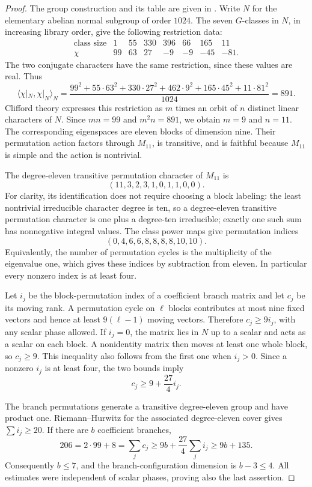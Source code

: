 \documentclass[11pt]{article}
\theoremstyle{definition}
\theoremstyle{remark}
\begin{document}
\begin{proof}
The group construction and its table are given in
\cite[\S1.2-9]{CTblLib}. Write $N$ for the elementary abelian normal
subgroup of order $1024$. The seven $G$-classes in $N$, in increasing
library order, give the following restriction data:
\[
\begin{array}{c|rrrrrrr}
\text{class size}&1&55&330&396&66&165&11\\
\chi&99&63&27&-9&-9&-45&-81.
\end{array}
\]
The two conjugate characters have the same restriction, since these
values are real. Thus
\[
 \langle\chi|_N,\chi|_N\rangle_N
 =\frac{99^2+55\cdot63^2+330\cdot27^2
       +462\cdot9^2+165\cdot45^2+11\cdot81^2}{1024}
 =891.
\]
Clifford theory expresses this restriction as $m$ times an orbit of
$n$ distinct linear characters of $N$. Since $mn=99$ and
$m^2n=891$, we obtain $m=9$ and $n=11$. The corresponding eigenspaces
are eleven blocks of dimension nine. Their permutation action
factors through $M_{11}$, is transitive, and is faithful because
$M_{11}$ is simple and the action is nontrivial.

The degree-eleven transitive permutation character of $M_{11}$ is
\[
 (11,3,2,3,1,0,1,1,0,0).
\]
For clarity, its identification does not require choosing a block
labeling: the least nontrivial irreducible character degree is ten,
so a degree-eleven transitive permutation character is one plus a
degree-ten irreducible; exactly one such sum has nonnegative integral
values. The class power maps give permutation indices
\[
 (0,4,6,6,8,8,8,8,10,10).
\]
Equivalently, the number of permutation cycles is the multiplicity
of the eigenvalue one, which gives these indices by subtraction
from eleven. In particular every nonzero index is at least four.

Let $i_j$ be the block-permutation index of a coefficient branch
matrix and let $c_j$ be its moving rank. A permutation cycle on
$\ell$ blocks contributes at most nine fixed vectors and hence at
least $9(\ell-1)$ moving vectors. Therefore $c_j\ge9i_j$, with any
scalar phase allowed. If $i_j=0$, the matrix lies in $N$ up to a
scalar and acts as a scalar on each block. A nonidentity matrix
then moves at least one whole block, so $c_j\ge9$. This inequality
also follows from the first one when $i_j>0$. Since a nonzero
$i_j$ is at least four, the two bounds imply
\[
 c_j\ge9+\frac{27}{4}i_j.
\]

The branch permutations generate a transitive degree-eleven group
and have product one. Riemann--Hurwitz for the associated degree-eleven
cover gives $\sum i_j\ge20$. If there are $b$ coefficient branches,
\[
 206=2\cdot99+8=\sum_jc_j
     \ge9b+\frac{27}{4}\sum_ji_j
     \ge9b+135.
\]
Consequently $b\le7$, and the branch-configuration dimension is
$b-3\le4$. All estimates were independent of scalar phases, proving
also the last assertion.
\end{proof}
\end{document}
